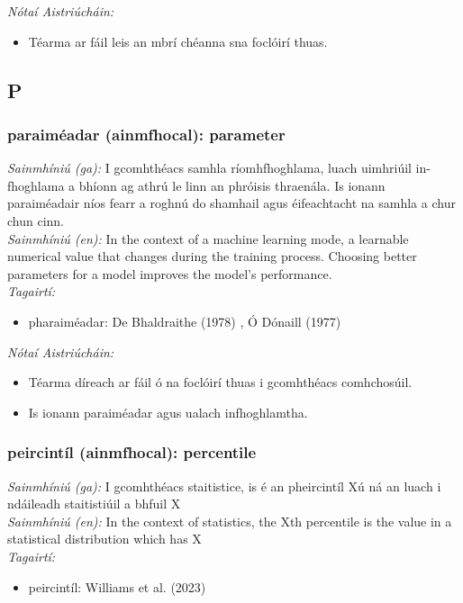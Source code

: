 \documentclass{article}
\begin{document}
 \noindent \textit{Nótaí Aistriúcháin:}
\begin{itemize}
	\item Téarma ar fáil leis an mbrí chéanna sna foclóirí thuas.
\end{itemize}


\subsection*{P}

\subsubsection*{paraiméadar (ainmfhocal): parameter}
 \noindent \textit{Sainmhíniú (ga):} I gcomhthéacs samhla ríomhfhoghlama, luach uimhriúil in-fhoghlama a bhíonn ag athrú le linn an phróisis thraenála. Is ionann paraiméadair níos fearr a roghnú do shamhail agus éifeachtacht na samhla a chur chun cinn.
\\
 \noindent \textit{Sainmhíniú (en):} In the context of a machine learning mode, a learnable numerical value that changes during the training process. Choosing better parameters for a model improves the model's performance.
\\
 \noindent \textit{Tagairtí:}
\begin{itemize}
	\item pharaiméadar: De Bhaldraithe (1978) \cite{de-bhaldraithe}, Ó Dónaill (1977) \cite{odonaill}
\end{itemize}

 \noindent \textit{Nótaí Aistriúcháin:}
\begin{itemize}
	\item Téarma díreach ar fáil ó na foclóirí thuas i gcomhthéacs comhchosúil.
	\item Is ionann paraiméadar agus ualach infhoghlamtha.
\end{itemize}


\subsubsection*{peircintíl (ainmfhocal): percentile}
 \noindent \textit{Sainmhíniú (ga):} I gcomhthéacs staitistice, is é an pheircintíl Xú ná an luach i ndáileadh staitistiúil a bhfuil X%
\\
 \noindent \textit{Sainmhíniú (en):} In the context of statistics, the Xth percentile is the value in a statistical distribution which has X%
\\
 \noindent \textit{Tagairtí:}
\begin{itemize}
	\item peircintíl: Williams et al. (2023) \cite{storchiste}
\end{itemize}
\end{document}
